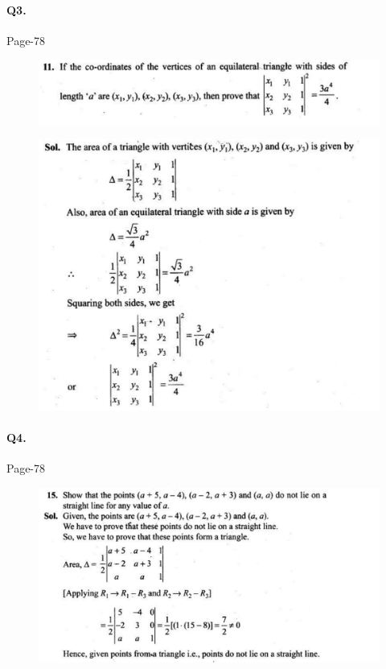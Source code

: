 \documentclass{article}
\begin{document}
\paragraph{Q3.}
\begin{flushright}
Page-78
\end{flushright}
\begin{figure}[H]
    \includegraphics[scale=0.5]{determinants_l1_ps_31.png}
\end{figure}
\begin{figure}[H]
    \includegraphics[scale=0.5]{determinants_l1_ps_32.png}
\end{figure}

\paragraph{Q4.}
\begin{flushright}
Page-78
\end{flushright}
\begin{figure}[H]
    \includegraphics[scale=0.5]{determinants_l1_ps_4.png}
\end{figure}
\end{document}
